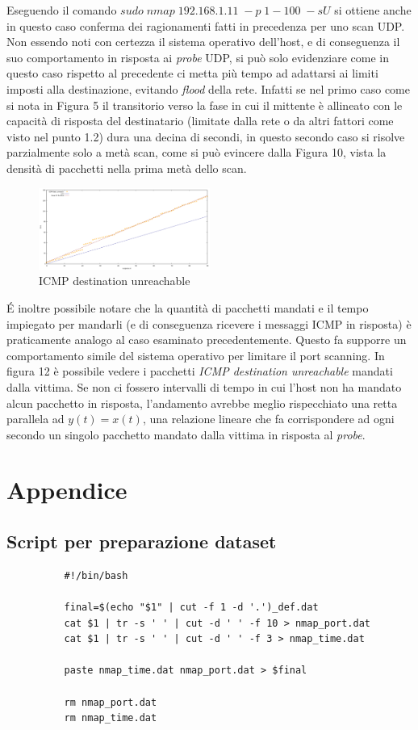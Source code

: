 \documentclass{article}
\begin{document}
Eseguendo il comando $sudo\; nmap \;192.168.1.11\; -p \; 1-100 \; -sU$ si ottiene anche in questo caso conferma dei ragionamenti 
fatti in precedenza per uno scan UDP. Non essendo noti con certezza il sistema operativo dell'host, e di conseguenza il suo 
comportamento in risposta ai \textit{probe} UDP, si può solo evidenziare come in questo caso rispetto al precedente ci metta più tempo
ad adattarsi ai limiti imposti alla destinazione, evitando \textit{flood} della rete. Infatti se nel primo caso come si nota in Figura 5
il transitorio verso la fase in cui il mittente è allineato con le capacità di risposta del destinatario (limitate dalla rete o da altri fattori come visto nel punto 1.2)
dura una decina di secondi, in questo secondo caso si risolve parzialmente solo a metà scan, come si può evincere dalla Figura 10, vista la densità di 
pacchetti nella prima metà dello scan. \\
\begin{figure} %
  \centering
  \includegraphics[width=0.5\textwidth]{port_unreach_vs_time (1).png}
  \caption{ICMP destination unreachable}\label{Fig:icmp}
\end{figure}
\'E inoltre possibile notare che la quantità di pacchetti mandati e il tempo impiegato per mandarli (e di conseguenza ricevere i messaggi
ICMP in risposta) è praticamente analogo al caso esaminato precedentemente. Questo fa supporre un comportamento simile del sistema operativo per 
limitare il port scanning. In figura 12 è possibile vedere i pacchetti \textit{ICMP destination unreachable} mandati dalla vittima. Se non ci 
fossero intervalli di tempo in cui l'host non ha mandato alcun pacchetto in risposta, l'andamento avrebbe meglio rispecchiato una retta parallela ad $y(t)=x(t)$,
una relazione lineare che fa corrispondere ad ogni secondo un singolo pacchetto mandato dalla vittima in risposta al \textit{probe}. 



\pagebreak
\section{Appendice}
\subsection{Script per preparazione dataset}
        \begin{verbatim}
          #!/bin/bash

          final=$(echo "$1" | cut -f 1 -d '.')_def.dat
          cat $1 | tr -s ' ' | cut -d ' ' -f 10 > nmap_port.dat
          cat $1 | tr -s ' ' | cut -d ' ' -f 3 > nmap_time.dat
          
          paste nmap_time.dat nmap_port.dat > $final
          
          rm nmap_port.dat
          rm nmap_time.dat
          \end{verbatim}
\end{document}
